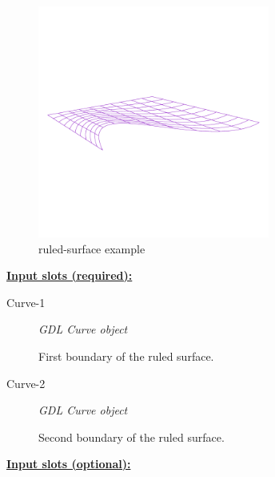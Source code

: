 \documentclass [11pt]{book}
\begin{document}
\begin{itemize}
\begin{figure}
\label{fig:example-code-ruled-surface}

\end{figure}

\begin{figure}
\begin{center}
\includegraphics[width=3in,height=3in]{../images/example-ruled-surface.pdf}
\end{center}

\caption{ruled-surface example}

\label{fig:ruled-surface}

\end{figure}





\textbf{
\underline{Input slots (required):}}

\begin{description}

\item [Curve-1]
\emph{GDL Curve object}

 First boundary of the ruled surface.




\item [Curve-2]
\emph{GDL Curve object}

 Second boundary of the ruled surface.




\end{description}






\textbf{
\underline{Input slots (optional):}}

\begin{description}


\end{description}
\end{itemize}
\end{document}
